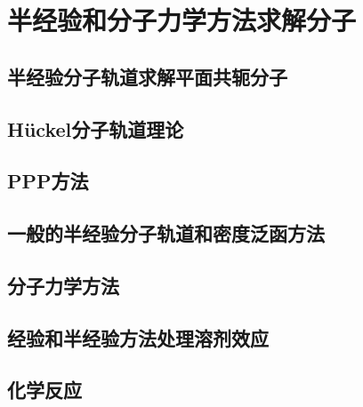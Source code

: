 \chapter{半经验和分子力学方法求解分子}
\section{半经验分子轨道求解平面共轭分子}

\section{Hückel分子轨道理论}

\section{PPP方法}

\section{一般的半经验分子轨道和密度泛函方法}

\section{分子力学方法}

\section{经验和半经验方法处理溶剂效应}

\section{化学反应}

